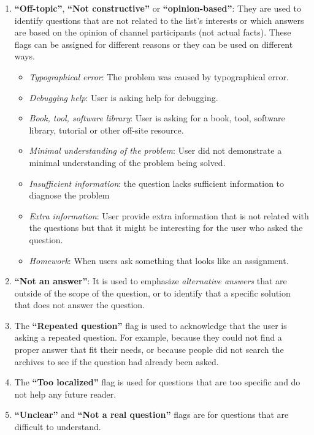 \documentclass{sig-alternate-05-2015}
\begin{document}
	\begin{enumerate}[\bfseries (1)]
		\item \textbf{``Off-topic''}, \textbf{``Not constructive''} or \textbf{``opinion-based''}: They are used to identify questions that are not related to the list's interests or which answers are based on the opinion of channel participants (not actual facts).
		These flags can be assigned for different reasons or they can be used on different ways.
		\begin{itemize}
			\item \textit{Typographical error}: The problem was caused by typographical error.
			\item \textit{Debugging help}: User is asking help for debugging.
			\item \textit{Book, tool, software library}: User is asking for a book, tool, software library, tutorial or other off-site resource.
			\item \textit{Minimal understanding of the problem}: User did not demonstrate a minimal understanding of the problem being solved.
			\item \textit{Insufficient information}: the question lacks sufficient information to diagnose the problem
			\item \textit{Extra information}: User provide extra information that is not related with the questions but that it might be interesting for the user who asked the question.
			\item \textit{Homework}: When users ask something that looks like an assignment.
		\end{itemize}
		\item \textbf{``Not an answer''}: It is used to emphasize \textit{alternative answers} that are outside of the scope of the question, or to identify that a specific solution that does not answer the question.
		\item The \textbf{``Repeated question''} flag is used to acknowledge that the user is asking a repeated question. For example, because they could not find a proper answer that fit their needs, or because people did not search the archives to see if the question had already been asked.
		\item The \textbf{``Too localized''} flag is used for questions that are too specific and do not help any future reader.
		\item \textbf{``Unclear''} and  \textbf{``Not a real question''} flags are for questions that are difficult to understand.
	\end{enumerate}
\end{document}
